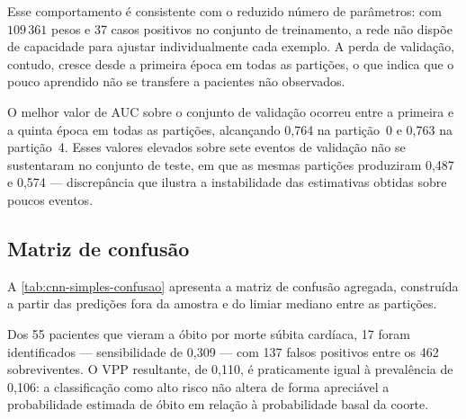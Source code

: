 Esse comportamento é consistente com o reduzido número de parâmetros: com
$109\,361$ pesos e 37 casos positivos no conjunto de treinamento, a rede não
dispõe de capacidade para ajustar individualmente cada exemplo. A perda de
validação, contudo, cresce desde a primeira época em todas as partições, o
que indica que o pouco aprendido não se transfere a pacientes não observados.

O melhor valor de \gls{AUC} sobre o conjunto de validação ocorreu entre a
primeira e a quinta época em todas as partições, alcançando 0,764 na
partição~0 e 0,763 na partição~4. Esses valores elevados sobre sete eventos
de validação não se sustentaram no conjunto de teste, em que as mesmas
partições produziram 0,487 e 0,574 --- discrepância que ilustra a
instabilidade das estimativas obtidas sobre poucos eventos.

\subsection{Matriz de confusão}
\label{subsec:confusao-cnn-simples}

A \autoref{tab:cnn-simples-confusao} apresenta a matriz de confusão agregada,
construída a partir das predições fora da amostra e do limiar mediano entre
as partições.

\begin{table}[h!]
	\captionsetup{width=11cm}
\end{table}

Dos 55 pacientes que vieram a óbito por morte súbita cardíaca, 17 foram
identificados --- sensibilidade de 0,309 --- com 137 falsos positivos entre
os 462 sobreviventes. O \gls{VPP} resultante, de 0,110, é praticamente igual
à prevalência de 0,106: a classificação como alto risco não altera de forma
apreciável a probabilidade estimada de óbito em relação à probabilidade basal
da coorte.



